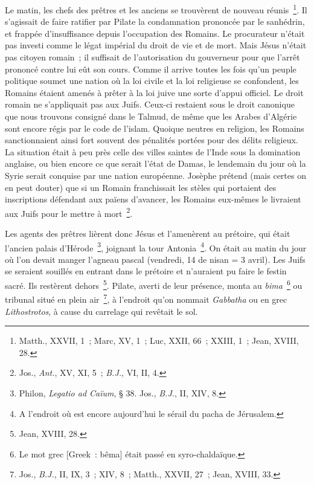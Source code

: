 \documentclass[french,twoside]{book} %
\begin{document}
Le matin, les chefs des prêtres et les anciens se trouvèrent de nouveau réunis \footnote{Matth., XXVII, 1 ; Marc, XV, 1 ; Luc, XXII, 66 ; XXIII, 1 ; Jean, XVIII, 28.}. Il s’agissait de faire ratifier par Pilate la condamnation prononcée par le sanhédrin, et frappée d’insuffisance depuis l’occupation des Romains. Le procurateur n’était pas investi comme le légat impérial du droit de vie et de mort. Mais Jésus n’était pas citoyen romain ; il suffisait de l’autorisation du gouverneur pour que l’arrêt prononcé contre lui eût son cours. Comme il arrive toutes les fois qu’un peuple politique soumet une nation où la loi civile et la loi religieuse se confondent, les Romains étaient amenés à prêter à la loi juive une sorte d’appui officiel. Le droit romain ne s’appliquait pas aux Juifs. Ceux-ci restaient sous le droit canonique que nous trouvons consigné dans le Talmud, de même que les Arabes d’Algérie sont encore régis par le code de l’islam. Quoique neutres en religion, les Romains sanctionnaient ainsi fort souvent des pénalités portées pour des délits religieux. La situation était à peu près celle des villes saintes de l’Inde sous la domination anglaise, ou bien encore ce que serait l’état de Damas, le lendemain du jour où la Syrie serait conquise par une nation européenne. Josèphe prétend (mais certes on en peut douter) que si un Romain franchissait les stèles qui portaient des inscriptions défendant aux païens d’avancer, les Romains eux-mêmes le livraient aux Juifs pour le mettre à mort \footnote{ Jos., {\itshape Ant.}, XV, XI, 5 ; {\itshape B.J.}, VI, II, 4.}.\par
Les agents des prêtres lièrent donc Jésus et l’amenèrent au prétoire, qui était l’ancien palais d’Hérode \footnote{ Philon, {\itshape Legatio ad Caïum}, § 38. Jos., {\itshape B.J.}, II, XIV, 8.}, joignant la tour Antonia \footnote{A l’endroit où est encore aujourd’hui le sérail du pacha de Jérusalem.}. On était au matin du jour où l’on devait manger l’agneau pascal (vendredi, 14 de nisan = 3 avril). Les Juifs se seraient souillés en entrant dans le prétoire et n’auraient pu faire le festin sacré. Ils restèrent dehors \footnote{Jean, XVIII, 28.}. Pilate, averti de leur présence, monta au {\itshape bima} \footnote{ Le mot grec [Greek : bêma] était passé en syro-chaldaïque.} ou tribunal situé en plein air \footnote{ Jos., {\itshape B.J.}, II, IX, 3 ; XIV, 8 ; Matth., XXVII, 27 ; Jean, XVIII, 33.}, à l’endroit qu’on nommait {\itshape Gabbatha} ou en grec {\itshape Lithostrotos}, à cause du carrelage qui revêtait le sol.\par
\end{document}
